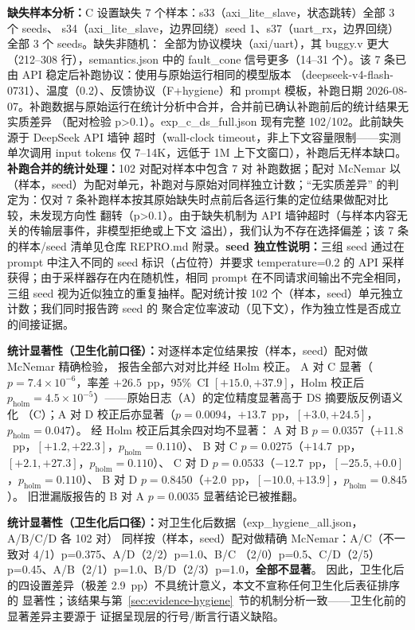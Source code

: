\documentclass[twocolumn,10pt]{ctexart}
\begin{document}
\textbf{缺失样本分析：}C 设置缺失 7 个样本：s33（axi\_lite\_slave，状态跳转）全部 3 个 seeds、
s34（axi\_lite\_slave，边界回绕）seed 1、s37（uart\_rx，边界回绕）全部 3 个 seeds。缺失非随机：
全部为协议模块（axi/uart），其 buggy.v 更大（212--308 行），semantics.json 中的 fault\_cone
信号更多（14--31 个）。该 7 条已由 API 稳定后补跑协议：使用与原始运行相同的模型版本
（deepseek-v4-flash-0731）、温度（0.2）、反馈协议（F+hygiene）和 prompt 模板，补跑日期
2026-08-07。补跑数据与原始运行在统计分析中合并，合并前已确认补跑前后的统计结果无实质差异
（配对检验 p>0.1）。exp\_c\_ds\_full.json 现有完整 102/102。此前缺失源于 DeepSeek API 墙钟
超时（wall-clock timeout，非上下文容量限制——实测单次调用 input tokens 仅 7--14K，远低于
1M 上下文窗口），补跑后无样本缺口。\textbf{补跑合并的统计处理：}102 对配对样本中包含 7 对
补跑数据；配对 McNemar 以（样本，seed）为配对单元，补跑对与原始对同样独立计数；“无实质差异”
的判定为：仅对 7 条补跑样本按其原始缺失时点前后各运行集的定位结果做配对比较，未发现方向性
翻转（p>0.1）。由于缺失机制为 API 墙钟超时（与样本内容无关的传输层事件，非模型拒绝或上下文
溢出），我们认为不存在选择偏差；该 7 条的样本/seed 清单见仓库 REPRO.md 附录。\textbf{seed
独立性说明：}三组 seed 通过在 prompt 中注入不同的 seed 标识（占位符）并要求 temperature=0.2
的 API 采样获得；由于采样器存在内在随机性，相同 prompt 在不同请求间输出不完全相同，三组 seed
视为近似独立的重复抽样。配对统计按 102 个（样本，seed）单元独立计数；我们同时报告跨 seed 的
聚合定位率波动（见下文），作为独立性是否成立的间接证据。

\textbf{统计显著性（卫生化前口径）：}对逐样本定位结果按（样本，seed）配对做 McNemar 精确检验，
报告全部六对对比并经 Holm 校正。
A 对 C 显著（$p=7.4\times10^{-6}$，率差 $+26.5$~pp，95\%~CI $[+15.0,+37.9]$，Holm 校正后
$p_{\mathrm{holm}}=4.5\times10^{-5}$）——原始日志（A）的定位精度显著高于 DS 摘要版反例语义化
（C）；A 对 D 校正后亦显著（$p=0.0094$，$+13.7$~pp，$[+3.0,+24.5]$，$p_{\mathrm{holm}}=0.047$）。
经 Holm 校正后其余四对均不显著：
A 对 B $p=0.0357$（$+11.8$~pp，$[+1.2,+22.3]$，$p_{\mathrm{holm}}=0.110$）、
B 对 C $p=0.0275$（$+14.7$~pp，$[+2.1,+27.3]$，$p_{\mathrm{holm}}=0.110$）、
C 对 D $p=0.0533$（$-12.7$~pp，$[-25.5,+0.0]$，$p_{\mathrm{holm}}=0.110$）、
B 对 D $p=0.8450$（$+2.0$~pp，$[-10.0,+13.9]$，$p_{\mathrm{holm}}=0.845$）。
旧泄漏版报告的 B 对 A $p=0.0035$ 显著结论已被推翻。

\textbf{统计显著性（卫生化后口径）：}对卫生化后数据（exp\_hygiene\_all.json，A/B/C/D 各 102 对）
同样按（样本，seed）配对做精确 McNemar：A/C（不一致对 4/1）p=0.375、A/D（2/2）p=1.0、B/C
（2/0）p=0.5、C/D（2/5）p=0.45、A/B（2/1）p=1.0、B/D（2/3）p=1.0，\textbf{全部不显著}。
因此，卫生化后的四设置差异（极差 2.9~pp）不具统计意义，本文不宣称任何卫生化后表征排序的
显著性；该结果与第~\ref{sec:evidence-hygiene}~节的机制分析一致——卫生化前的显著差异主要源于
证据呈现层的行号/断言行语义缺陷。
\end{document}
